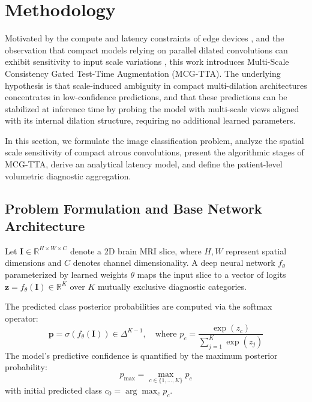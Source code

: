 \section{Methodology}
\label{sec:methodology}

Motivated by the compute and latency constraints of edge devices \cite{9, 20, 21}, and the observation that compact models relying on parallel dilated convolutions can exhibit sensitivity to input scale variations \cite{5, 16}, this work introduces Multi-Scale Consistency Gated Test-Time Augmentation (MCG-TTA). The underlying hypothesis is that scale-induced ambiguity in compact multi-dilation architectures concentrates in low-confidence predictions, and that these predictions can be stabilized at inference time by probing the model with multi-scale views aligned with its internal dilation structure, requiring no additional learned parameters.

In this section, we formulate the image classification problem, analyze the spatial scale sensitivity of compact atrous convolutions, present the algorithmic stages of MCG-TTA, derive an analytical latency model, and define the patient-level volumetric diagnostic aggregation.

\subsection{Problem Formulation and Base Network Architecture}

Let $\mathbf{I} \in \mathbb{R}^{H \times W \times C}$ denote a 2D brain MRI slice, where $H, W$ represent spatial dimensions and $C$ denotes channel dimensionality. A deep neural network $f_\theta$ parameterized by learned weights $\theta$ maps the input slice to a vector of logits $\mathbf{z} = f_\theta(\mathbf{I}) \in \mathbb{R}^K$ over $K$ mutually exclusive diagnostic categories. 

The predicted class posterior probabilities are computed via the softmax operator:
\begin{equation}
\mathbf{p} = \sigma\left(f_\theta(\mathbf{I})\right) \in \Delta^{K-1}, \quad \text{where } p_c = \frac{\exp(z_c)}{\sum_{j=1}^K \exp(z_j)}
\label{eq:softmax}
\end{equation}
The model's predictive confidence is quantified by the maximum posterior probability:
\begin{equation}
p_{\max} = \max_{c \in \{1, \dots, K\}} p_c
\end{equation}
with initial predicted class $c_0 = \arg\max_c p_c$.

